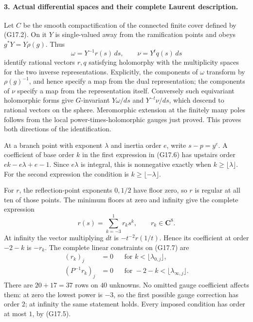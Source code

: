 \paragraph{3. Actual differential spaces and their complete Laurent description.}
Let $C$ be the smooth compactification of the connected finite cover
defined by (G17.2).  On it $Y$ is single-valued away from the
ramification points and obeys $g^*Y=Y\rho(g)$.
Thus
\[
       \omega=Y^{-1}r(s)\,ds,\qquad
       \nu=Y^tq(s)\,ds                              \tag{G17.6}
\]
identify rational vectors $r,q$ satisfying holomorphy with the
multiplicity spaces for the two inverse representations.
Explicitly, the
components of $\omega$ transform by $\rho(g)^{-1}$, and hence
specify a map from the dual representation; the components of
$\nu$ specify a map from the representation itself.
Conversely such equivariant holomorphic forms give $G$-invariant
$Y\omega/ds$ and $Y^{-t}\nu/ds$, which descend to rational vectors
on the sphere.  Meromorphic extension at the finitely many poles
follows from the local power-times-holomorphic gauges just proved.
This proves both directions of the identification.

At a branch point with exponent $\lambda$ and inertia order $e$,
write $s-p=y^e$.  A coefficient of base order $k$ in the first
expression in (G17.6) has upstairs order
$ek-e\lambda+e-1$.  Since $e\lambda$ is integral, this is nonnegative
exactly when $k\ge\lfloor\lambda\rfloor$.
For the second expression the condition is
$k\ge\lfloor-\lambda\rfloor$.

For $r$, the reflection-point exponents $0,1/2$ have floor zero,
so $r$ is regular at all ten of those points.  The minimum floors
at zero and infinity give the complete expression
\begin{equation}
                   r(s)=\sum_{k=-3}^{1} r_k s^k,
                   \qquad r_k\in\mathbf C^8.          \tag{G17.7}
\end{equation}
At infinity the vector multiplying $dt$ is
$-t^{-2}r(1/t)$.  Hence its coefficient at order $-2-k$ is $-r_k$.
The complete linear constraints on (G17.7) are
\begin{align}
 (r_k)_j&=0 &&\text{for }k<\lfloor\lambda_{0,j}\rfloor,
                                                        \tag{G17.8}\\
 (P^{-1}r_k)_j&=0
       &&\text{for }-2-k<\lfloor\lambda_{\infty,j}\rfloor .
                                                        \tag{G17.9}
\end{align}
There are $20+17=37$ rows on $40$ unknowns.
No omitted gauge coefficient affects them: at zero the lowest
power is $-3$, so the first possible gauge correction has order $2$;
at infinity the same statement holds.  Every imposed condition
has order at most $1$, by (G17.5).

